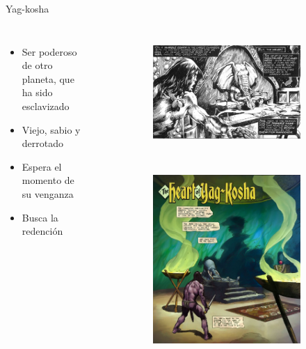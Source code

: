 \begin{frame}{Yag-kosha}
\begin{columns}
\begin{itemize}
 \item Ser poderoso de otro  planeta, que ha sido esclavizado
 \item Viejo, sabio y derrotado
 \item Espera el momento de su venganza
 \item Busca la redención
\end{itemize}
\begin{figure}[htp]
 \centering
 \begin{subfigure}[b]{0.35\textwidth}
   \includegraphics[width=\textwidth]{img/yogh/TSSC}
 \end{subfigure}
~
 \begin{subfigure}[b]{0.3\textwidth}
   \includegraphics[width=\textwidth]{img/yogh/DH}

\end{subfigure}
\end{figure}
\end{columns}
\end{frame}
